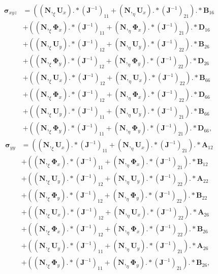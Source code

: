 \documentclass[preprint,12pt]{elsarticle}
\renewcommand{\vec}[1]{\mathbf{#1}}
\renewcommand{\bm}[1]{\mathbf{#1}}
\newcommand{\bs}[1]{\boldsymbol{#1}}
\begin{document}
	\begin{equation}
	\begin{split}
	\bs{\sigma}_{xyz}&=\left((\bm{N},_{\xi}\vec{U}_x).*(\vec{J}^{-1})_{11}+(\bm{N},_{\eta}\vec{U}_x).*(\vec{J}^{-1})_{21}\right).*\vec{B}_{16}\\
	&+\left((\bm{N},_{\xi}\bs{\Phi}_x).*(\vec{J}^{-1})_{11}+(\bm{N},_{\eta}\bs{\Phi}_x).*(\vec{J}^{-1})_{21}\right).*\vec{D}_{16}\\
	&+\left((\bm{N},_{\xi}\vec{U}_y).*(\vec{J}^{-1})_{12}+(\bm{N},_{\eta}\vec{U}_y).*(\vec{J}^{-1})_{22}\right).*\vec{B}_{26}\\
	&+\left((\bm{N},_{\xi}\bs{\Phi}_y).*(\vec{J}^{-1})_{12}+(\bm{N},_{\eta}\bs{\Phi}_y).*(\vec{J}^{-1})_{22}\right).*\vec{D}_{26}\\
	&+\left((\bm{N},_{\xi}\vec{U}_x).*(\vec{J}^{-1})_{12}+(\bm{N},_{\eta}\vec{U}_x).*(\vec{J}^{-1})_{22}\right).*\vec{B}
	_{66}\\
	&+\left((\bm{N},_{\xi}\bs{\Phi}_x).*(\vec{J}^{-1})_{12}+(\bm{N},_{\eta}\bs{\Phi}_x).*(\vec{J}^{-1})_{22}\right).*\vec{D}_{66}\\
	&+\left((\bm{N},_{\xi}\vec{U}_y).*(\vec{J}^{-1})_{11}+(\bm{N},_{\eta}\vec{U}_y).*(\vec{J}^{-1})_{21}\right).*\vec{B}_{66}\\
	&+\left((\bm{N},_{\xi}\bs{\Phi}_y).*(\vec{J}^{-1})_{11}+(\bm{N},_{\eta}\bs{\Phi}_y).*(\vec{J}^{-1})_{21}\right).*\vec{D}_{66},
	\end{split}
	\end{equation}
	\begin{equation}
	\begin{split}
	\bs{\sigma}_{yy}&=\left((\bm{N},_{\xi}\vec{U}_x).*(\vec{J}^{-1})_{11}+(\bm{N},_{\eta}\vec{U}_x).*(\vec{J}^{-1})_{21}\right).*\vec{A}_{12}\\
	&+\left((\bm{N},_{\xi}\bs{\Phi}_x).*(\vec{J}^{-1})_{11}+(\bm{N},_{\eta}\bs{\Phi}_x).*(\vec{J}^{-1})_{21}\right).*\vec{B}_{12}\\
	&+\left((\bm{N},_{\xi}\vec{U}_y).*(\vec{J}^{-1})_{12}+(\bm{N},_{\eta}\vec{U}_y).*(\vec{J}^{-1})_{22}\right).*\vec{A}_{22}\\
	&+\left((\bm{N},_{\xi}\bs{\Phi}_y).*(\vec{J}^{-1})_{12}+(\bm{N},_{\eta}\bs{\Phi}_y).*(\vec{J}^{-1})_{22}\right).*\vec{B}_{22}\\
	&+\left((\bm{N},_{\xi}\vec{U}_x).*(\vec{J}^{-1})_{12}+(\bm{N},_{\eta}\vec{U}_x).*(\vec{J}^{-1})_{22}\right).*\vec{A}_{26}\\
	&+\left((\bm{N},_{\xi}\bs{\Phi}_x).*(\vec{J}^{-1})_{12}+(\bm{N},_{\eta}\bs{\Phi}_x).*(\vec{J}^{-1})_{22}\right).*\vec{B}_{26}\\
	&+\left((\bm{N},_{\xi}\vec{U}_y).*(\vec{J}^{-1})_{11}+(\bm{N},_{\eta}\vec{U}_y).*(\vec{J}^{-1})_{21}\right).*\vec{A}_{26}\\
	&+\left((\bm{N},_{\xi}\bs{\Phi}_y).*(\vec{J}^{-1})_{11}+(\bm{N},_{\eta}\bs{\Phi}_y).*(\vec{J}^{-1})_{21}\right).*\vec{B}_{26},
	\end{split}
	\end{equation}
\end{document}
